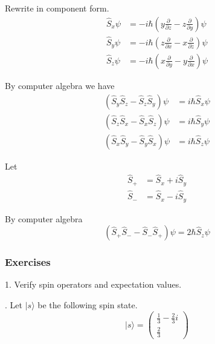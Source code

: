 Rewrite in component form.
\begin{align*}
\hat S_x\psi&=-i\hbar\left(y\frac{\partial}{\partial z}-z\frac{\partial}{\partial y}\right)\psi
\\
\hat S_y\psi&=-i\hbar\left(z\frac{\partial}{\partial x}-x\frac{\partial}{\partial z}\right)\psi
\\
\hat S_z\psi&=-i\hbar\left(x\frac{\partial}{\partial y}-y\frac{\partial}{\partial x}\right)\psi
\end{align*}

By computer algebra we have
\begin{align*}
(\hat S_y\hat S_z-\hat S_z\hat S_y)\psi&=i\hbar\hat S_x\psi
\\
(\hat S_z\hat S_x-\hat S_x\hat S_z)\psi&=i\hbar\hat S_y\psi
\\
(\hat S_x\hat S_y-\hat S_y\hat S_x)\psi&=i\hbar\hat S_z\psi
\end{align*}

Let
\begin{align*}
\hat S_+&=\hat S_x+i\hat S_y
\\
\hat S_-&=\hat S_x-i\hat S_y
\end{align*}

By computer algebra
\begin{equation*}
(\hat S_+\hat S_--\hat S_-\hat S_+)\psi=2\hbar\hat S_z\psi
\end{equation*}

\subsubsection*{Exercises}

1. Verify spin operators and expectation values.

\iffalse
\begin{align*}
S_x&=\frac{\hbar}{2}\left(|x_+\rangle\langle x_+|-|x_-\rangle\langle x_-|\right)
\\
S_y&=\frac{\hbar}{2}\left(|y_+\rangle\langle y_+|-|y_-\rangle\langle y_-|\right)
\\
S_z&=\frac{\hbar}{2}\left(|z_+\rangle\langle z_+|-|z_-\rangle\langle z_-|\right)
\end{align*}
\fi

. Let $|s\rangle$ be the following spin state.
\begin{equation*}
|s\rangle=\begin{pmatrix}\frac{1}{3}-\frac{2}{3}i\\[1ex]\frac{2}{3}\end{pmatrix}
\end{equation*}

